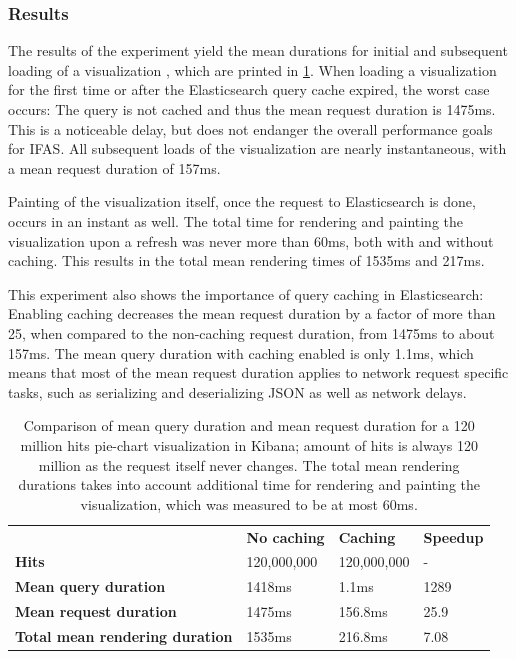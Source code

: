 \subsubsection{Results}

The results of the experiment yield the mean durations for initial and subsequent loading of a visualization , which are printed in \cref{table:kibana-config-comparison}.
When loading a visualization for the first time or after the Elasticsearch query cache expired, the worst case occurs: The query is not cached and thus the mean request duration is 1475ms.
This is a noticeable delay, but does not endanger the overall performance goals for \ac{IFAS}.
All subsequent loads of the visualization are nearly instantaneous, with a mean request duration of 157ms.

Painting of the visualization itself, once the request to Elasticsearch is done, occurs in an instant as well.
The total time for rendering and painting the visualization upon a refresh was never more than 60ms, both with and without caching.
This results in the total mean rendering times of 1535ms and 217ms.

This experiment also shows the importance of query caching in Elasticsearch:
Enabling caching decreases the mean request duration by a factor of more than 25, when compared to the non-caching request duration, from 1475ms to about 157ms.
The mean query duration with caching enabled is only 1.1ms, which means that most of the mean request duration applies to network request specific tasks, such as serializing and deserializing JSON as well as network delays.

\begin{table}
\caption{Comparison of mean query duration and mean request duration for a 120 million hits pie-chart visualization in Kibana; amount of hits is always 120 million as the request itself never changes. The total mean rendering durations takes into account additional time for rendering and painting the visualization, which was measured to be at most 60ms.}
\label{table:kibana-config-comparison}
\centering
\begin{tabular}{llll}
& \textbf{No caching}                                      & \textbf{Caching} & \textbf{Speedup} \\
\textbf{Hits} & 120,000,000 & 120,000,000 & - \\
\textbf{Mean query duration} & 1418ms & 1.1ms & 1289 \\
\textbf{Mean request duration} & 1475ms & 156.8ms & 25.9 \\
\textbf{Total mean rendering duration} & 1535ms & 216.8ms & 7.08 \\

\end{tabular}
\end{table}



